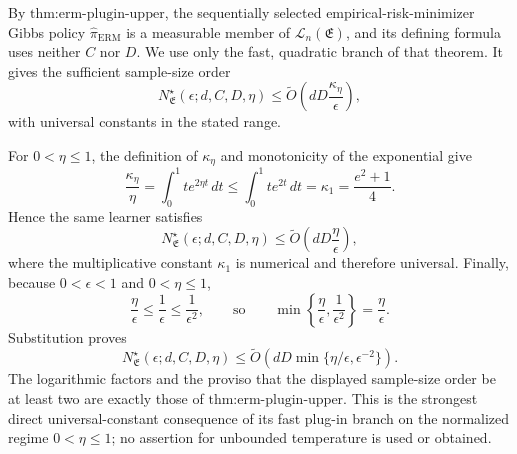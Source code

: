 By \(\text{thm:erm-plugin-upper}\), the sequentially selected empirical-risk-minimizer Gibbs policy \(\widehat\pi_{\mathrm{ERM}}\) is a measurable member of \(\mathcal L_n(\mathfrak E)\), and its defining formula uses neither \(C\) nor \(D\). We use only the fast, quadratic branch of that theorem. It gives the sufficient sample-size order
\[
N^\star_{\mathfrak E}(\epsilon;d,C,D,\eta)
\le \widetilde O\!\left(dD\frac{\kappa_\eta}{\epsilon}\right),
\]
with universal constants in the stated range.

For \(0<\eta\le1\), the definition of \(\kappa_\eta\) and monotonicity of the exponential give
\[
\frac{\kappa_\eta}{\eta}
=\int_0^1 t e^{2\eta t}\,dt
\le \int_0^1 t e^{2t}\,dt
=\kappa_1
=\frac{e^2+1}{4}.
\]
Hence the same learner satisfies
\[
N^\star_{\mathfrak E}(\epsilon;d,C,D,\eta)
\le \widetilde O\!\left(dD\frac{\eta}{\epsilon}\right),
\]
where the multiplicative constant \(\kappa_1\) is numerical and therefore universal. Finally, because \(0<\epsilon<1\) and \(0<\eta\le1\),
\[
\frac{\eta}{\epsilon}\le\frac1\epsilon\le\frac1{\epsilon^2},
\qquad\text{so}\qquad
\min\left\{\frac{\eta}{\epsilon},\frac1{\epsilon^2}\right\}
=\frac{\eta}{\epsilon}.
\]
Substitution proves
\[
N^\star_{\mathfrak E}(\epsilon;d,C,D,\eta)
\le\widetilde O\!\left(dD\min\{\eta/\epsilon,\epsilon^{-2}\}\right).
\]
The logarithmic factors and the proviso that the displayed sample-size order be at least two are exactly those of \(\text{thm:erm-plugin-upper}\). This is the strongest direct universal-constant consequence of its fast plug-in branch on the normalized regime \(0<\eta\le1\); no assertion for unbounded temperature is used or obtained.